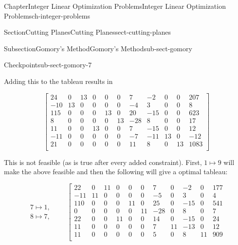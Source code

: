 \documentclass[oneside,10pt,]{book}
\numberwithin{equation}{section}
\newcommand{\amp}{&}
\begin{document}
\begin{chapterptx}{Chapter}{Integer Linear Optimization Problems}{}{Integer Linear Optimization Problems}{}{}{ch-integer-problems}
\begin{sectionptx}{Section}{Cutting Planes}{}{Cutting Planes}{}{}{sect-cutting-planes}
\begin{subsectionptx}{Subsection}{Gomory's Method}{}{Gomory's Method}{}{}{sub-sect-gomory}
\begin{inlineexercise}{Checkpoint}{}{sub-sect-gomory-7}
%
\par
Adding this to the tableau results in%
\par
%
\begin{equation*}
\left[\begin{array}{rrr|rrrrrrr|r}
24 \amp 0 \amp 13 \amp 0 \amp 0 \amp 0 \amp 7 \amp -2 \amp 0 \amp 0 \amp 207\\
-10 \amp 13 \amp 0 \amp 0 \amp 0 \amp 0 \amp -4 \amp 3 \amp 0 \amp 0 \amp 8\\
115 \amp 0 \amp 0 \amp 0 \amp 13 \amp 0 \amp 20 \amp -15 \amp 0 \amp 0 \amp 623\\
8 \amp 0 \amp 0 \amp 0 \amp 0 \amp 13 \amp -28 \amp 8 \amp 0 \amp 0 \amp 17\\
11 \amp 0 \amp 0 \amp 13 \amp 0 \amp 0 \amp 7 \amp -15 \amp 0 \amp 0 \amp 12\\
-11 \amp 0 \amp 0 \amp 0 \amp 0 \amp 0 \amp -7 \amp -11 \amp 13 \amp 0 \amp -12\\ \hline
21 \amp 0 \amp 0 \amp 0 \amp 0 \amp 0 \amp 11 \amp 8 \amp 0 \amp 13 \amp 1083\\
\end{array} \right]
\end{equation*}
%
\par
This is not feasible (as is true after every added constraint).  First, \(1 \mapsto 9\) will make the above feasible and then the following will give a optimal tableau:%
\par
%
\begin{equation*}
\begin{array}{r} 7 \mapsto 1, \\ 8 \mapsto 7, \end{array}  \qquad
\left[\begin{array}{rrr|rrrrrrr|r}
22 \amp 0 \amp 11 \amp 0 \amp 0 \amp 0 \amp 7 \amp 0 \amp -2 \amp 0 \amp 177\\
-11 \amp 11 \amp 0 \amp 0 \amp 0 \amp 0 \amp -5 \amp 0 \amp 3 \amp 0 \amp 4\\
110 \amp 0 \amp 0 \amp 0 \amp 11 \amp 0 \amp 25 \amp 0 \amp -15 \amp 0 \amp 541\\
0 \amp 0 \amp 0 \amp 0 \amp 0 \amp 11 \amp -28 \amp 0 \amp 8 \amp 0 \amp 7\\
22 \amp 0 \amp 0 \amp 11 \amp 0 \amp 0 \amp 14 \amp 0 \amp -15 \amp 0 \amp 24\\
11 \amp 0 \amp 0 \amp 0 \amp 0 \amp 0 \amp 7 \amp 11 \amp -13 \amp 0 \amp 12\\ \hline
11 \amp 0 \amp 0 \amp 0 \amp 0 \amp 0 \amp 5 \amp 0 \amp 8 \amp 11 \amp 909\\

\end{array}
\end{equation*}
\end{inlineexercise}
\end{subsectionptx}
\end{sectionptx}
\end{chapterptx}
\end{document}
